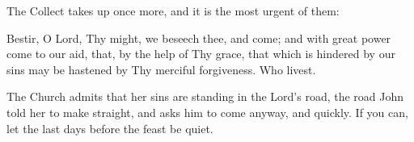 The Collect takes up  once more, and it is the most urgent of
them:

\begin{studyframe}
\medskip

Bestir, O Lord, Thy might, we beseech thee, and come; and with great power come
to our aid, that, by the help of Thy grace, that which is hindered by our sins
may be hastened by Thy merciful forgiveness. Who livest.\par
\end{studyframe}

The Church admits that her sins are standing in the Lord's road, the road John
told her to make straight, and asks him to come anyway, and quickly. If you
can, let the last days before the feast be quiet.
